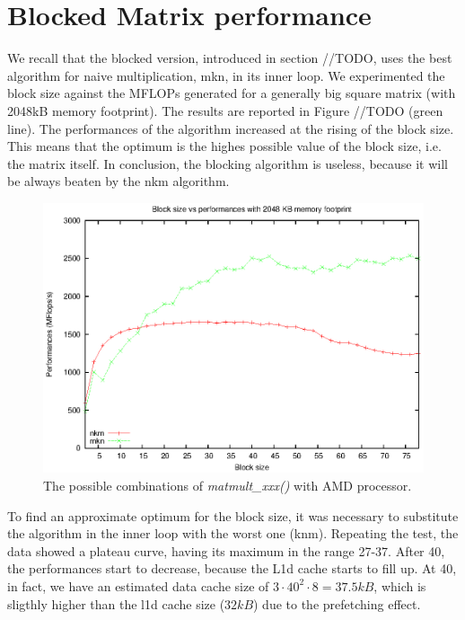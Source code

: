 \section{Blocked Matrix performance}
We recall that the blocked version, introduced in section //TODO, uses the best algorithm for naive multiplication, mkn, in its inner loop. We experimented the block size against the MFLOPs generated for a generally big square matrix (with 2048kB memory footprint). The results are reported in Figure //TODO (green line). The performances of the algorithm increased at the rising of the block size. This means that the optimum is the highes possible value of the block size, i.e. the matrix itself. In conclusion, the blocking algorithm is useless, because it will be always beaten by the nkm algorithm. 

\begin{figure}[here]
\centering
\includegraphics[width=\textwidth]{results/blkwrong.eps}
\caption{The possible combinations of \emph{matmult\_xxx()} with AMD processor.}
\label{fig:lowk}
\end{figure}

To find an approximate optimum for the block size, it was necessary to substitute the algorithm in the inner loop with the worst one (knm). Repeating the test, the data showed a plateau curve, having its maximum in the range 27-37. After 40, the performances start to decrease, because the L1d cache starts to fill up. At 40, in fact, we have an estimated data cache size of $3 \cdot 40^2 \cdot 8 = 37.5kB$, which is sligthly higher than the l1d cache size ($32kB$) due to the prefetching effect.  

